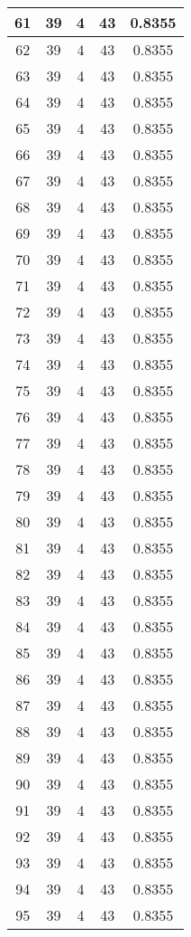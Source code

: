 \documentclass[letterpaper, 12pt]{article}
\begin{document}
\begin{longtable}{|c|c|c|c|c|}
61 & 39 & 4 & 43 & 0.8355 \\
\hline
62 & 39 & 4 & 43 & 0.8355 \\
\hline
63 & 39 & 4 & 43 & 0.8355 \\
\hline
64 & 39 & 4 & 43 & 0.8355 \\
\hline
65 & 39 & 4 & 43 & 0.8355 \\
\hline
66 & 39 & 4 & 43 & 0.8355 \\
\hline
67 & 39 & 4 & 43 & 0.8355 \\
\hline
68 & 39 & 4 & 43 & 0.8355 \\
\hline
69 & 39 & 4 & 43 & 0.8355 \\
\hline
70 & 39 & 4 & 43 & 0.8355 \\
\hline
71 & 39 & 4 & 43 & 0.8355 \\
\hline
72 & 39 & 4 & 43 & 0.8355 \\
\hline
73 & 39 & 4 & 43 & 0.8355 \\
\hline
74 & 39 & 4 & 43 & 0.8355 \\
\hline
75 & 39 & 4 & 43 & 0.8355 \\
\hline
76 & 39 & 4 & 43 & 0.8355 \\
\hline
77 & 39 & 4 & 43 & 0.8355 \\
\hline
78 & 39 & 4 & 43 & 0.8355 \\
\hline
79 & 39 & 4 & 43 & 0.8355 \\
\hline
80 & 39 & 4 & 43 & 0.8355 \\
\hline
81 & 39 & 4 & 43 & 0.8355 \\
\hline
82 & 39 & 4 & 43 & 0.8355 \\
\hline
83 & 39 & 4 & 43 & 0.8355 \\
\hline
84 & 39 & 4 & 43 & 0.8355 \\
\hline
85 & 39 & 4 & 43 & 0.8355 \\
\hline
86 & 39 & 4 & 43 & 0.8355 \\
\hline
87 & 39 & 4 & 43 & 0.8355 \\
\hline
88 & 39 & 4 & 43 & 0.8355 \\
\hline
89 & 39 & 4 & 43 & 0.8355 \\
\hline
90 & 39 & 4 & 43 & 0.8355 \\
\hline
91 & 39 & 4 & 43 & 0.8355 \\
\hline
92 & 39 & 4 & 43 & 0.8355 \\
\hline
93 & 39 & 4 & 43 & 0.8355 \\
\hline
94 & 39 & 4 & 43 & 0.8355 \\
\hline
95 & 39 & 4 & 43 & 0.8355 \\

\end{longtable}
\end{document}
